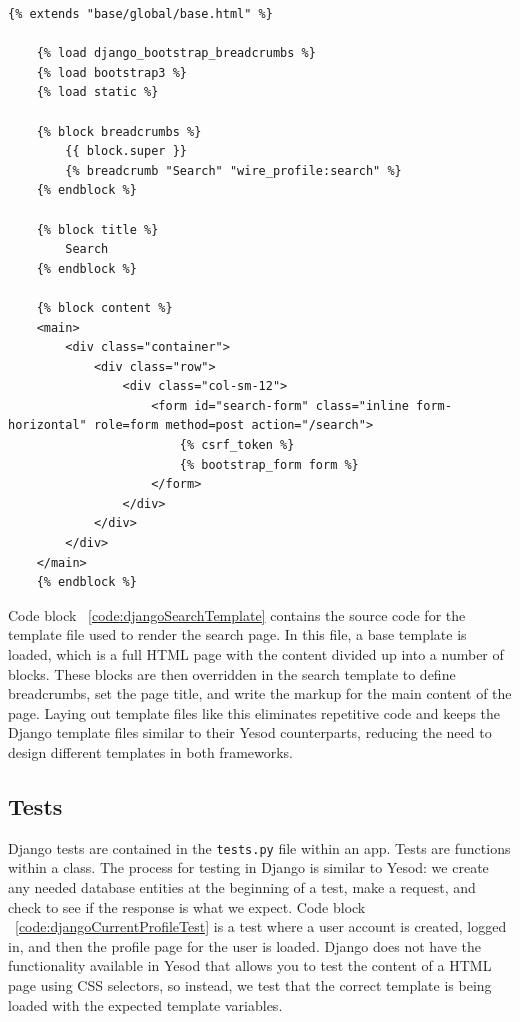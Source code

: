 \newpage

\begin{lstlisting}[caption={Template file for the search page},label={code:djangoSearchTemplate}]
	{% extends "base/global/base.html" %}

	{% load django_bootstrap_breadcrumbs %}
	{% load bootstrap3 %}
	{% load static %}
	
	{% block breadcrumbs %}
		{{ block.super }}
		{% breadcrumb "Search" "wire_profile:search" %}
	{% endblock %}
	
	{% block title %}
		Search
	{% endblock %}
	
	{% block content %}
	<main>
		<div class="container">
			<div class="row">
				<div class="col-sm-12">
					<form id="search-form" class="inline form-horizontal" role=form method=post action="/search">
						{% csrf_token %}
						{% bootstrap_form form %}
					</form>
				</div>
			</div>
		</div>
	</main>
	{% endblock %}
\end{lstlisting}

Code block ~\ref{code:djangoSearchTemplate} contains the source code for the
template file used to render the search page. In this file, a base template
is loaded, which is a full HTML page with the content divided up
into a number of blocks. These blocks are then overridden in the search template
to define breadcrumbs, set the page title, and write the markup for the main
content of the page. Laying out template files like this eliminates repetitive
code and keeps the Django template files similar to their Yesod counterparts,
reducing the need to design different templates in both frameworks.

\subsection{Tests}

Django tests are contained in the \texttt{tests.py} file within an app. Tests
are functions within a class. The process for testing in Django is similar to
Yesod: we create any needed database entities at the beginning of a test,
make a request, and check to see if the response is what we expect. Code
block ~\ref{code:djangoCurrentProfileTest} is a test where a user account
is created, logged in, and then the profile page for the user is loaded.
Django does not have the functionality available in Yesod that allows you
to test the content of a HTML page using CSS selectors, so instead, we test
that the correct template is being loaded with the expected template variables.

